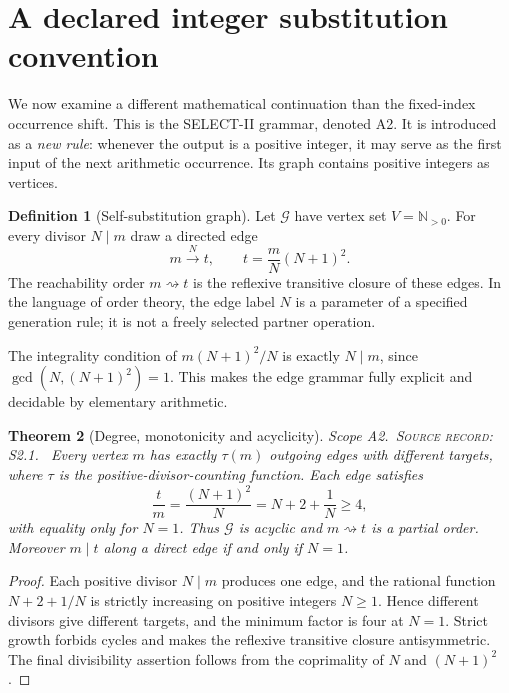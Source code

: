 \documentclass[11pt,oneside,openany]{book}
\newtheorem{theorem}{Theorem}[chapter]
\theoremstyle{definition}
\newtheorem{definition}[theorem]{Definition}
\theoremstyle{remark}
\newcommand{\N}{\mathbb{N}}
\newcommand{\gcdop}{\operatorname{gcd}}
\newcommand{\scope}[1]{\textsf{\small Scope #1.}\ }
\newcommand{\record}[1]{\textup{\textsc{Source record: #1.}}\ }
\newcommand{\Gen}{\mathcal{G}}
\begin{document}
\section{A declared integer substitution convention}
We now examine a different mathematical continuation than the fixed-index occurrence shift. This is the SELECT-II grammar, denoted \textsf{A2}. It is introduced as a \emph{new rule}: whenever the output is a positive integer, it may serve as the first input of the next arithmetic occurrence. Its graph contains positive integers as vertices.

\begin{definition}[Self-substitution graph]\label{def:graph}
Let \(\Gen\) have vertex set \(V=\N_{>0}\). For every divisor \(N\mid m\) draw a directed edge
\begin{equation}\label{eq:graph-edge}
 m\overset{N}{\longrightarrow}t,
 \qquad t=\frac{m}{N}(N+1)^2.
\end{equation}
The reachability order \(m\rightsquigarrow t\) is the reflexive transitive closure of these edges. In the language of order theory, the edge label \(N\) is a parameter of a specified generation rule; it is not a freely selected partner operation.
\end{definition}

The integrality condition of \(m(N+1)^2/N\) is exactly \(N\mid m\), since \(\gcdop(N,(N+1)^2)=1\). This makes the edge grammar fully explicit and decidable by elementary arithmetic.

\begin{theorem}[Degree, monotonicity and acyclicity]\label{thm:degrees}
\scope{A2}\record{S2.1} Every vertex \(m\) has exactly \(\tau(m)\) outgoing edges with different targets, where \(\tau\) is the positive-divisor-counting function. Each edge satisfies
\begin{equation}\label{eq:growth-factor}
 \frac{t}{m}=\frac{(N+1)^2}{N}=N+2+\frac1N\ge4,
\end{equation}
with equality only for \(N=1\). Thus \(\Gen\) is acyclic and \(m\rightsquigarrow t\) is a partial order. Moreover \(m\mid t\) along a direct edge if and only if \(N=1\).
\end{theorem}
\begin{proof}
Each positive divisor \(N\mid m\) produces one edge, and the rational function \(N+2+1/N\) is strictly increasing on positive integers \(N\ge1\). Hence different divisors give different targets, and the minimum factor is four at \(N=1\). Strict growth forbids cycles and makes the reflexive transitive closure antisymmetric. The final divisibility assertion follows from the coprimality of \(N\) and \((N+1)^2\).
\end{proof}
\end{document}
